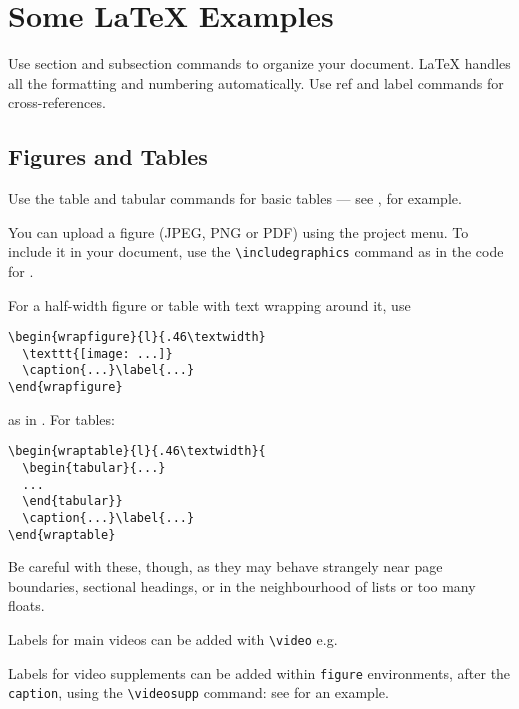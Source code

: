\section{Some \LaTeX{} Examples}
\label{sec:examples}

Use section and subsection commands to organize your document. \LaTeX{} handles all the formatting and numbering automatically. Use ref and label commands for cross-references.

\subsection{Figures and Tables}

Use the table and tabular commands for basic tables --- see , for example. 

You can upload a figure (JPEG, PNG or PDF) using the project menu. To include it in your document, use the \verb|\includegraphics| command as in the code for . 

For a half-width figure or table with text wrapping around it, use 

\begin{verbatim}
\begin{wrapfigure}{l}{.46\textwidth}
  \texttt{[image: ...]}
  \caption{...}\label{...}
\end{wrapfigure}
\end{verbatim}
%
as in . For tables:

\begin{verbatim}
\begin{wraptable}{l}{.46\textwidth}{
  \begin{tabular}{...}
  ...
  \end{tabular}}
  \caption{...}\label{...}
\end{wraptable}
\end{verbatim}

Be careful with these, though, as they may behave strangely near page boundaries, sectional headings, or in the neighbourhood of lists or too many floats.

Labels for main videos can be added with \verb|\video| e.g.

\label{video:mv1}

Labels for video supplements can be added within \texttt{figure} environments, after the \texttt{caption}, using the \verb|\videosupp| command: see  for an example.

